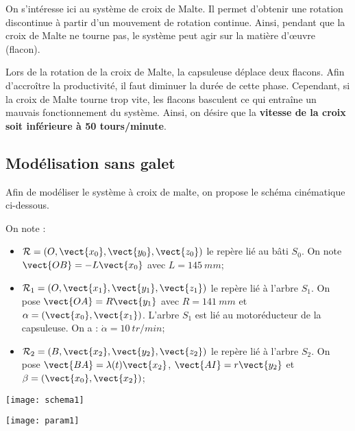 On s'intéresse ici au système de croix de Malte. Il permet d'obtenir une rotation discontinue à partir d'un mouvement de rotation continue. Ainsi, pendant que la croix de Malte ne tourne pas, le système peut agir sur la matière d'\oe{}uvre (flacon).

Lors de la rotation de la croix de Malte, la capsuleuse déplace deux flacons. Afin d'accroître la productivité, il faut diminuer la durée de cette phase. Cependant, si la croix de Malte tourne trop vite, les flacons basculent ce qui entraîne un mauvais fonctionnement du système. Ainsi, on désire que la \textbf{vitesse de la croix soit inférieure à 50 tours/minute}. 

\fi


\subsection*{Modélisation sans galet}

\ifprof
\else
Afin de modéliser le système à croix de malte, on propose le schéma cinématique ci-dessous. 


On note :
\begin{itemize}
\item $\mathcal{R}=\left( O,\vect{x_0},\vect{y_0},\vect{z_0}\right)$ le repère lié au bâti $S_0$. On note $\vect{OB}=-L\vect{x_0}$ avec $L = \SI{145}{mm}$;
\item $\mathcal{R}_1=\left( O,\vect{x_1},\vect{y_1},\vect{z_1}\right)$ le repère lié à l'arbre $S_1$. On pose $\vect{OA}=R\vect{y_1}$  avec $R =\SI{141}{mm}$ et $\alpha = \left( \vect{x_0}, \vect{x_1}\right)$. L'arbre $S_1$ est lié au motoréducteur de la capsuleuse. On a : $\dot{\alpha} = \SI{10}{tr/min}$;
\item  $\mathcal{R}_2=\left( B,\vect{x_2},\vect{y_2},\vect{z_2}\right)$ le repère lié à l'arbre $S_2$. On pose $\vect{BA}=\lambda(t)\vect{x_2}$,  $\vect{AI}=r\vect{y_2}$ et $\beta = \left( \vect{x_0}, \vect{x_2}\right)$;
\end{itemize}


\begin{center}
 \texttt{[image: schema1]}
\end{center}
\fi






\ifprof%
\begin{corrige}
\begin{center}
 \texttt{[image: param1]}
\end{center}
\end{corrige}
\else \fi

